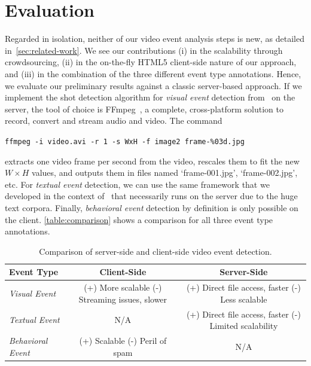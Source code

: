 \documentclass[runningheads,a4paper]{llncs}
\begin{document}
\section{Evaluation}
Regarded in isolation, neither of our video event analysis steps is new, as detailed in~\autoref{sec:related-work}. We see our contributions (i) in the scalability through crowdsourcing, (ii) in the on-the-fly HTML5 client-side nature of our approach, and (iii) in the combination of the three different event type annotations. Hence, we evaluate our preliminary results against a classic server-based approach. If we implement the shot detection algorithm for \emph{visual event} detection from~\cite{artemis} on the server, the tool of choice is FFmpeg~\cite{www.ffmpeg.org}, a complete, cross-platform solution to record, convert and stream audio and video. The command

\noindent \texttt{ffmpeg -i video.avi -r 1 -s WxH -f image2 frame-\%03d.jpg}

\noindent extracts one video frame per second from the video, rescales them to fit the new $W \times H$ values, and outputs them in files named `frame-001.jpg', `frame-002.jpg', etc. For \emph{textual event} detection, we can use the same framework that we developed in the context of~\cite{semwebvid} that necessarily runs on the server due to the huge text corpora. Finally, \emph{behavioral event} detection by definition is only possible on the client. \autoref{table:comparison} shows a comparison for all three event type annotations.

\begin{table}
\begin{center}  
    \begin{tabular}{ | l | c | c |}
    \hline
    \textbf{Event Type} & \textbf{Client-Side} & \textbf{Server-Side} \\ \hline
    \emph{Visual Event} & (+) More scalable (-) Streaming issues, slower & (+) Direct file access, faster (-) Less scalable \\ \hline
    \emph{Textual Event} & N/A & (+) Direct file access, faster (-) Limited scalability \\ \hline
    \emph{Behavioral Event} & (+) Scalable (-) Peril of spam & N/A \\ \hline
    \end{tabular}
\end{center}
\caption{Comparison of server-side and client-side video event detection.}
\label{table:comparison}
\end{table}
\end{document}
